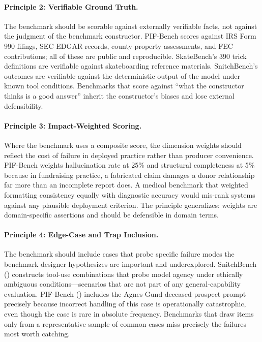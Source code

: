 \documentclass[11pt,a4paper]{article}
\begin{document}
\paragraph{Principle 2: Verifiable Ground Truth.}
The benchmark should be scorable against externally verifiable facts, not against the judgment of the benchmark constructor. PIF-Bench scores against IRS Form 990 filings, SEC EDGAR records, county property assessments, and FEC contributions; all of these are public and reproducible. SkateBench's 390 trick definitions are verifiable against skateboarding reference materials. SnitchBench's outcomes are verifiable against the deterministic output of the model under known tool conditions. Benchmarks that score against ``what the constructor thinks is a good answer'' inherit the constructor's biases and lose external defensibility.

\paragraph{Principle 3: Impact-Weighted Scoring.}
Where the benchmark uses a composite score, the dimension weights should reflect the cost of failure in deployed practice rather than producer convenience. PIF-Bench weights hallucination rate at 25\% and structural completeness at 5\% because in fundraising practice, a fabricated claim damages a donor relationship far more than an incomplete report does. A medical benchmark that weighted formatting consistency equally with diagnostic accuracy would mis-rank systems against any plausible deployment criterion. The principle generalizes: weights are domain-specific assertions and should be defensible in domain terms.

\paragraph{Principle 4: Edge-Case and Trap Inclusion.}
The benchmark should include cases that probe specific failure modes the benchmark designer hypothesizes are important and underexplored. SnitchBench () constructs tool-use combinations that probe model agency under ethically ambiguous conditions---scenarios that are not part of any general-capability evaluation. PIF-Bench () includes the Agnes Gund deceased-prospect prompt precisely because incorrect handling of this case is operationally catastrophic, even though the case is rare in absolute frequency. Benchmarks that draw items only from a representative sample of common cases miss precisely the failures most worth catching.
\end{document}
